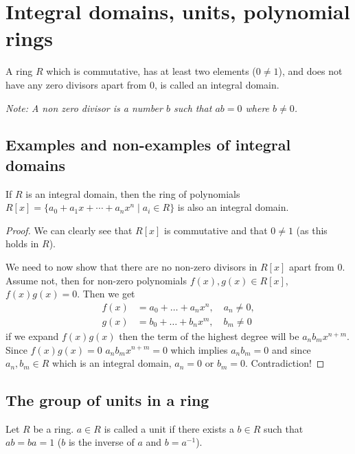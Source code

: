 \documentclass[10pt, a4paper]{article}
\begin{document}
\newpage

\section{Integral domains,
units,
polynomial rings}

\begin{definition}
    A ring $R$ which is commutative,
    has at least two elements
    ($0 \neq 1$),
    and does not have any zero divisors apart from $0$,
    is called an integral domain.
\end{definition}
\textit{Note:
A non zero divisor is a number $b$ such that $ab = 0$ where $b \neq 0$.}

\subsection{Examples and non-examples of integral domains}
\begin{proposition}
    If $R$ is an integral domain,
    then the ring of polynomials $R[x] = \{a_0 + a_1x + \dotsi + a_nx ^ n\mid a_i \in R\}$ is also an integral domain.

    \begin{proof}
        We can clearly see that $R[x]$ is commutative and that $0 \neq 1$
        (as this holds in $R$).

        We need to now show that there are no non-zero divisors in $R[x]$ apart from $0$.
        Assume not,
        then for non-zero polynomials $f(x), g(x) \in R[x]$,
        $f(x)g(x) = 0$.
        Then we get
        \begin{align*}
            f(x) &= a_0 + \dotsc + a_nx ^ n,\quad a_n \neq 0, \\
            g(x) &= b_0 + \dotsc + b_nx ^ m,\quad b_m \neq 0
        \end{align*}
        if we expand $f(x)g(x)$ then the term of the highest degree will be $a_nb_mx ^ {n + m}$.
        Since $f(x)g(x) = 0$ $a_nb_mx ^ {n + m} = 0$ which implies $a_nb_m = 0$ and since $a_n, b_m \in R$ which is an integral domain, $a_n = 0$ or $b_m = 0$.
        Contradiction!
    \end{proof}
\end{proposition}

\subsection{The group of units in a ring}
Let $R$ be a ring.
$a \in R$ is called a unit if there exists a $b \in R$ such that $ab = ba = 1$
($b$ is the inverse of $a$ and $b = a ^ {-1}$).
\end{document}

